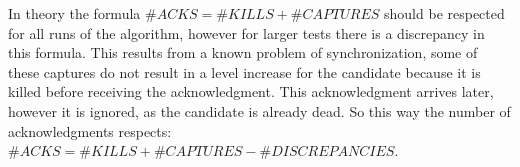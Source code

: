 	\begin{table}[h] 
		\centering
		\caption{Tests summary}\label{tab:testtable}
	\end{table}

	In theory the formula $\#ACKS = \#KILLS+\#CAPTURES$ should be respected for all runs of the algorithm, however for larger tests there is a discrepancy in this formula. This results from a known problem of synchronization, some of these captures do not result in a level increase for the candidate because it is killed before receiving the acknowledgment. This acknowledgment arrives later, however it is ignored, as the candidate is already dead. So this way the number of acknowledgments respects: $\#ACKS = \#KILLS+\#CAPTURES-\#DISCREPANCIES$.
	
	\newpage

